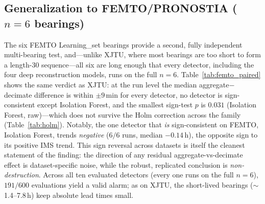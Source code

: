 \documentclass[journal]{IEEEtran}
\begin{document}
\subsection{Generalization to FEMTO/PRONOSTIA ($n{=}6$ bearings)}
\label{sec:femto}
The six FEMTO Learning\_set bearings provide a second, fully independent
multi-bearing test, and---unlike XJTU, where most bearings are too short to form
a length-30 sequence---all six are long enough that every detector, including
the four deep reconstruction models, runs on the full $n{=}6$.
Table~\ref{tab:femto_paired} shows the same verdict as XJTU: at the run level the
median aggregate$-$decimate difference is within $\pm9$\,min for every detector,
no detector is sign-consistent except Isolation Forest, and the smallest sign-test
$p$ is $0.031$ (Isolation Forest, raw)---which does not survive the Holm
correction across the family (Table~\ref{tab:holm}). Notably, the one detector
that \emph{is} sign-consistent on FEMTO, Isolation Forest, trends \emph{negative}
($6/6$ runs, median $-0.14$\,h), the opposite sign to its positive IMS trend.
This sign reversal across datasets is itself the cleanest statement of the
finding: the direction of any residual aggregate-vs-decimate effect is
dataset-specific noise, while the robust, replicated conclusion is
\emph{non-destruction}. Across all ten evaluated detectors (every one runs on the full
$n{=}6$), $191/600$
evaluations yield a valid alarm; as on XJTU, the short-lived bearings
($\sim$1.4--7.8\,h) keep absolute lead times small.
\end{document}
